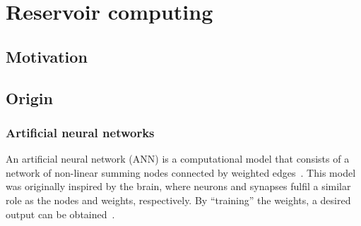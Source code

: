 \section{Reservoir computing}\label{sec:1:RC}
\subsection{Motivation}
\subsection{Origin}
\subsubsection{Artificial neural networks}
An artificial neural network (ANN) is a computational model that consists of a network of non-linear summing nodes connected by weighted edges~\cite{EvaluatingRestrictedESNs}.
This model was originally inspired by the brain, where neurons and synapses fulfil a similar role as the nodes and weights, respectively.
By ``training'' the weights, a desired output can be obtained~\cite{EvaluatingRestrictedESNs}. \par

